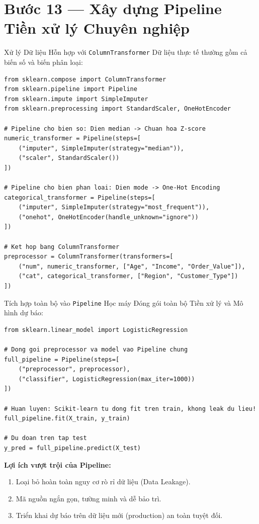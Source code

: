 \documentclass[aspectratio=169,11pt]{beamer}
\newcommand{\smallgap}{\vspace{0.35em}}
\begin{document}
\section{Bước 13 — Xây dựng Pipeline Tiền xử lý Chuyên nghiệp}

\begin{frame}[fragile]{Xử lý Dữ liệu Hỗn hợp với \texttt{ColumnTransformer}}
Dữ liệu thực tế thường gồm cả biến số và biến phân loại:
\begin{lstlisting}[style=tinypythonstyle]
from sklearn.compose import ColumnTransformer
from sklearn.pipeline import Pipeline
from sklearn.impute import SimpleImputer
from sklearn.preprocessing import StandardScaler, OneHotEncoder

# Pipeline cho bien so: Dien median -> Chuan hoa Z-score
numeric_transformer = Pipeline(steps=[
    ("imputer", SimpleImputer(strategy="median")),
    ("scaler", StandardScaler())
])

# Pipeline cho bien phan loai: Dien mode -> One-Hot Encoding
categorical_transformer = Pipeline(steps=[
    ("imputer", SimpleImputer(strategy="most_frequent")),
    ("onehot", OneHotEncoder(handle_unknown="ignore"))
])

# Ket hop bang ColumnTransformer
preprocessor = ColumnTransformer(transformers=[
    ("num", numeric_transformer, ["Age", "Income", "Order_Value"]),
    ("cat", categorical_transformer, ["Region", "Customer_Type"])
])
\end{lstlisting}
\end{frame}

\begin{frame}[fragile]{Tích hợp toàn bộ vào \texttt{Pipeline} Học máy}
Đóng gói toàn bộ Tiền xử lý và Mô hình dự báo:
\begin{lstlisting}[style=pythonstyle]
from sklearn.linear_model import LogisticRegression

# Dong goi preprocessor va model vao Pipeline chung
full_pipeline = Pipeline(steps=[
    ("preprocessor", preprocessor),
    ("classifier", LogisticRegression(max_iter=1000))
])

# Huan luyen: Scikit-learn tu dong fit tren train, khong leak du lieu!
full_pipeline.fit(X_train, y_train)

# Du doan tren tap test
y_pred = full_pipeline.predict(X_test)
\end{lstlisting}

\smallgap
\textbf{Lợi ích vượt trội của Pipeline:}
\begin{enumerate}
  \item Loại bỏ hoàn toàn nguy cơ rò rỉ dữ liệu (Data Leakage).
  \item Mã nguồn ngắn gọn, tường minh và dễ bảo trì.
  \item Triển khai dự báo trên dữ liệu mới (production) an toàn tuyệt đối.
\end{enumerate}
\end{frame}
\end{document}
